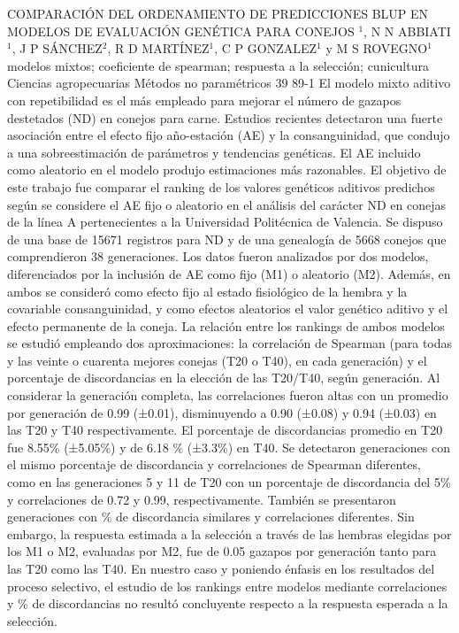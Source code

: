 \A
{COMPARACIÓN DEL ORDENAMIENTO DE PREDICCIONES BLUP EN MODELOS DE EVALUACIÓN GENÉTICA PARA CONEJOS}
{$^1$, N N ABBIATI$^1$, J P SÁNCHEZ$^2$, R D MARTÍNEZ$^1$, C P GONZALEZ$^1$ y M S ROVEGNO$^1$}
{
\\}
{modelos mixtos; coeficiente de spearman; respuesta a la selección; cunicultura} 
 {Ciencias agropecuarias} 
 {Métodos no paramétricos} 
 {39} 
 {89-1}
{El modelo mixto aditivo con repetibilidad es el más empleado para mejorar el número de gazapos destetados (ND) en conejos para carne. Estudios recientes detectaron una fuerte asociación entre el efecto fijo año-estación (AE) y la consanguinidad, que condujo a una sobreestimación de parámetros y tendencias genéticas. El AE incluido como aleatorio en el modelo produjo estimaciones más razonables. El objetivo de este trabajo fue comparar el ranking de los valores genéticos aditivos predichos según se considere el AE fijo o aleatorio en el análisis del carácter ND en conejas de la línea A pertenecientes a la Universidad Politécnica de Valencia. Se dispuso de una base de 15671 registros para ND y de una genealogía de 5668 conejos que comprendieron 38 generaciones. Los datos fueron analizados por dos modelos, diferenciados por la inclusión de AE como fijo (M1) o aleatorio (M2). Además, en ambos se consideró como efecto fijo al estado fisiológico de la hembra y la covariable consanguinidad, y como efectos aleatorios el valor genético aditivo y el efecto permanente de la coneja. La relación entre los rankings de ambos modelos se estudió empleando dos aproximaciones: la correlación de Spearman (para todas y las veinte o cuarenta mejores conejas (T20 o T40), en cada generación) y el porcentaje de discordancias en la elección de las T20/T40, según generación. Al considerar la generación completa, las correlaciones fueron altas con un promedio por generación de 0.99 (±0.01), disminuyendo a 0.90 (±0.08) y 0.94 (±0.03) en las T20 y T40 respectivamente. El porcentaje de discordancias promedio en T20 fue 8.55\% (±5.05\%) y de 6.18 \% (±3.3\%) en T40. Se detectaron generaciones con el mismo porcentaje de discordancia y correlaciones de Spearman diferentes, como en las generaciones 5 y 11 de T20 con un porcentaje de discordancia del 5\% y correlaciones de 0.72 y 0.99, respectivamente. También se presentaron generaciones con \% de discordancia similares y correlaciones diferentes. Sin embargo, la respuesta estimada a la selección a través de las hembras elegidas por los M1 o M2, evaluadas por M2, fue de 0.05 gazapos por generación tanto para las T20 como las T40. En nuestro caso y poniendo énfasis en los resultados del proceso selectivo, el estudio de los rankings entre modelos mediante correlaciones y \% de discordancias no resultó concluyente respecto a la respuesta esperada a la selección. }
